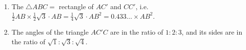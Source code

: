 \begin{enumerate}
    
    \item The $\triangle ABC =$ rectangle of $AC'$ and $CC'$, i.e.\ $\frac{1}{2}
        AB \times \frac{1}{2} \sqrt{3} \cdot AB = \frac{1}{4} \sqrt{3} \cdot
        AB^{2} = 0.433\ldots \times AB^{2}$.
    
    \item The angles of the triangle $AC'C$ are in the ratio of $1:2:3$, and its
        sides are in the ratio of $\sqrt{1}:\sqrt{3}:\sqrt{4}$.

\end{enumerate}

